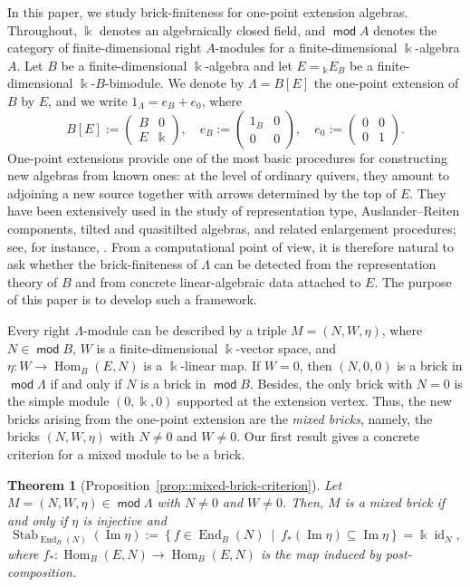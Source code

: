 \documentclass[a4,12pt]{amsart}
\numberwithin{equation}{section} %
\def\Hom{\operatorname{Hom}} %
\def\End{\operatorname{End}} %
\def\Im{\operatorname{Im}} %
\def\Stab{\operatorname{Stab}} %
\def\mod{\operatorname{\mathsf{mod}}}
\newtheorem{theorem*}{Theorem} %
\theoremstyle{definition} %
\begin{document}
In this paper, we study brick-finiteness for one-point extension algebras. Throughout, $\Bbbk$ denotes an algebraically closed field, and $\mod A$ denotes the category of finite-dimensional right $A$-modules for a finite-dimensional $\Bbbk$-algebra $A$. Let $B$ be a finite-dimensional $\Bbbk$-algebra and let $E={}_{\Bbbk}E_B$ be a finite-dimensional $\Bbbk$-$B$-bimodule. We denote by $\Lambda=B[E]$ the one-point extension of $B$ by $E$, and we write $1_{\Lambda}=e_B+e_0$, where
\[
B[E]:=
\begin{pmatrix}
B&0\\
E&\Bbbk
\end{pmatrix},
\quad
e_B:=
\begin{pmatrix}
1_B&0\\
0&0
\end{pmatrix},
\quad
e_0:=
\begin{pmatrix}
0&0\\
0&1
\end{pmatrix}.
\]
One-point extensions provide one of the most basic procedures for constructing new algebras from known ones: at the level of ordinary quivers, they amount to adjoining a new source together with arrows determined by the top of $E$. They have been extensively used in the study of representation type, Auslander--Reiten components, tilted and quasitilted algebras, and related enlargement procedures; see, for instance, \cite{de-la-Pena-one-point,Happel-Slungard-one-point,SS-Vol-3}. From a computational point of view, it is therefore natural to ask whether the brick-finiteness of $\Lambda$ can be detected from the representation theory of $B$ and from concrete linear-algebraic data attached to $E$. The purpose of this paper is to develop such a framework.

Every right $\Lambda$-module can be described by a triple $M=(N,W,\eta)$, where $N\in\mod B$, $W$ is a finite-dimensional $\Bbbk$-vector space, and $\eta\colon W\longrightarrow\Hom_B(E,N)$ is a $\Bbbk$-linear map. If $W=0$, then $(N,0,0)$ is a brick in $\mod \Lambda$ if and only if $N$ is a brick in $\mod B$. Besides, the only brick with $N=0$ is the simple module $(0,\Bbbk,0)$ supported at the extension vertex. Thus, the new bricks arising from the one-point extension are the \emph{mixed bricks}, namely, the bricks $(N,W,\eta)$ with $N\neq0$ and $W\neq0$. Our first result gives a concrete criterion for a mixed module to be a brick.

\begin{theorem*}[Proposition~\ref{prop::mixed-brick-criterion}]
Let $M=(N,W,\eta)\in\mod \Lambda$ with $N\neq0$ and $W\neq0$. Then, $M$ is a mixed brick if and only if $\eta$ is injective and
\[
\Stab_{\End_B(N)}(\Im\eta)
:=
\left\{
f\in\End_B(N)
\ \middle|\
f_*(\Im\eta)\subseteq\Im\eta
\right\}
=
\Bbbk\operatorname{id}_{N},
\]
where $f_*\colon\Hom_B(E,N)\longrightarrow\Hom_B(E,N)$ is the map induced by post-composition.
\end{theorem*}
\end{document}
